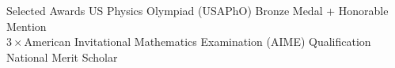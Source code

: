 \documentclass[
	11pt, %
]{resume} %
\begin{document}

\begin{rSection}{Selected Awards}
US Physics Olympiad (USAPhO) Bronze Medal + Honorable Mention \\ $3\times$American Invitational Mathematics Examination (AIME) Qualification \\ National Merit Scholar
\end{rSection}







\end{document}
